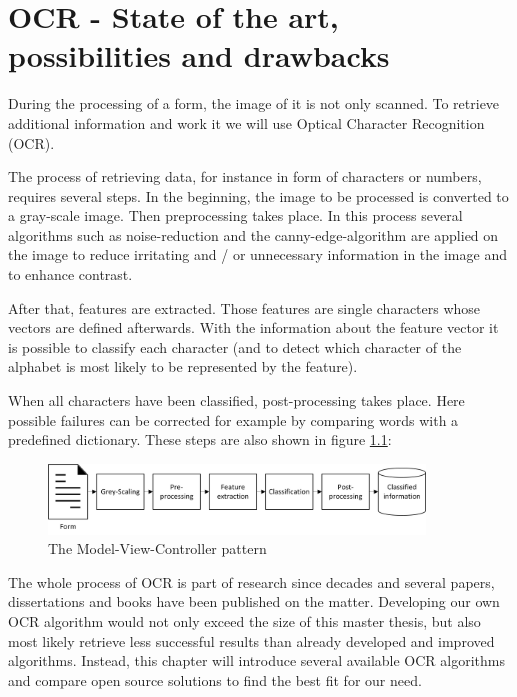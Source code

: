 %
% 
\chapter{OCR - State of the art, possibilities and drawbacks}
\label{cha3}

During the processing of a form, the image of it is not only scanned. To retrieve additional information and work it we will use Optical Character Recognition (OCR).

The process of retrieving data, for instance in form of characters or numbers, requires several steps. In the beginning, the image to be processed is converted to a gray-scale image. Then preprocessing takes place. In this process several algorithms such as noise-reduction and the canny-edge-algorithm are applied on the image to reduce irritating and / or unnecessary information in the image and to enhance contrast.

After that, features are extracted. Those features are single characters whose vectors are defined afterwards. With the information about the feature vector it is possible to classify each character (and to detect which character of the alphabet is most likely to be represented by the feature).

When all characters have been classified, post-processing takes place. Here possible failures can be corrected for example by comparing words with a predefined dictionary.
These steps are also shown in figure \ref{ocrSteps}:

\begin{figure}[ht!]
\centering
\includegraphics[width=100mm]{Images/OCR/Steps_Of_OCR.jpg}
\caption{The Model-View-Controller pattern \label{ocrSteps}}
\end{figure}

The whole process of OCR is part of research since decades and several papers, dissertations and books have been published on the matter. Developing our own OCR algorithm would not only exceed the size of this master thesis, but also most likely retrieve less successful results than already developed and improved algorithms. Instead, this chapter will introduce several available OCR algorithms and compare open source solutions to find the best fit for our need.

